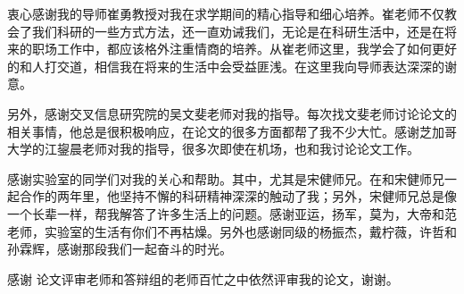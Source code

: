 \begin{acknowledgement}
  衷心感谢我的导师崔勇教授对我在求学期间的精心指导和细心培养。崔老师不仅教会了我们科研的一些方式方法，还一直劝诫我们，无论是在科研生活中，还是在将来的职场工作中，都应该格外注重情商的培养。从崔老师这里，我学会了如何更好的和人打交道，相信我在将来的生活中会受益匪浅。在这里我向导师表达深深的谢意。
  
  另外，感谢交叉信息研究院的吴文斐老师对我的指导。每次找文斐老师讨论论文的相关事情，他总是很积极响应，在论文的很多方面都帮了我不少大忙。感谢芝加哥大学的江鋆晨老师对我的指导，很多次即使在机场，也和我讨论论文工作。
  
  感谢实验室的同学们对我的关心和帮助。其中，尤其是宋健师兄。在和宋健师兄一起合作的两年里，他坚持不懈的科研精神深深的触动了我；另外，宋健师兄总是像一个长辈一样，帮我解答了许多生活上的问题。感谢亚运，扬军，莫为，大帝和范老师，实验室的生活有你们不再枯燥。另外也感谢同级的杨振杰，戴柠薇，许哲和孙霖辉，感谢那段我们一起奋斗的时光。

  感谢 论文评审老师和答辩组的老师百忙之中依然评审我的论文，谢谢。
\end{acknowledgement}
